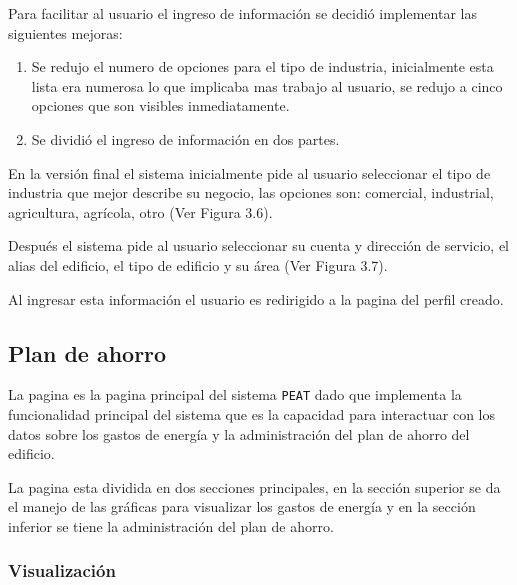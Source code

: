 
Para facilitar al usuario el ingreso de información se decidió implementar
las siguientes mejoras:

\begin{enumerate}
\item Se redujo el numero de opciones para el tipo de industria, inicialmente
  esta lista era numerosa lo que implicaba mas trabajo al usuario, se redujo
  a cinco opciones que son visibles inmediatamente.
\item Se dividió el ingreso de información en dos partes.
\end{enumerate}

En la versión final el sistema inicialmente pide al usuario seleccionar el tipo
de industria que mejor describe su negocio, las opciones son: comercial, industrial,
agricultura, agrícola, otro (Ver Figura 3.6).


Después el sistema pide al usuario seleccionar su cuenta y dirección
de servicio, el alias del edificio, el tipo de edificio y su área
(Ver Figura 3.7).


Al ingresar esta información el usuario es redirigido a la pagina
 del perfil creado.

\subsection{Plan de ahorro}

La pagina  es la pagina principal del sistema
\texttt{PEAT} dado que implementa la funcionalidad principal del sistema
que es la capacidad para interactuar con los datos sobre los gastos de
energía y la administración del plan de ahorro del edificio.

La pagina esta dividida en dos secciones principales, en la sección superior
se da el manejo de las gráficas para visualizar los gastos de energía y en la
sección inferior se tiene la administración del plan de ahorro.

\subsubsection{Visualización}


